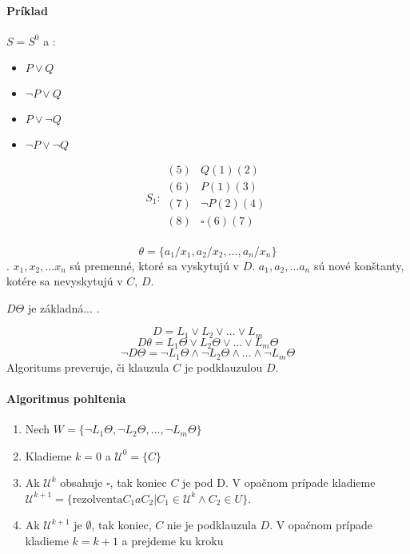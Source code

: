 \paragraph{Príklad} $S=S^0$ a :
\begin{itemize}
	\item $P\lor Q$
	\item $\neg P \lor Q$
	\item $P\lor \neg Q$
	\item $\neg P \lor \neg Q$
\end{itemize}
$$
S_1:
\begin{array}{ll}
(5)& Q (1) (2)\\
(6)& P (1) (3)\\
(7)& \neg P (2) (4)\\
(8)& \square (6) (7)\\
\end{array}
$$

$$\theta = \{ a_1 / x_1, a_2 / x_2, \ldots, a_n / x_n \}$$. $x_1, x_2, \ldots
x_n$ sú premenné, ktoré sa vyskytujú v $D$. $a_1, a_2, \ldots a_n$ sú nové
konštanty, kotére sa nevyskytujú v $C$, $D$.

$D\Theta$ je základná... .

$$D = L_1 \lor L_2 \lor \ldots \lor L_m$$
$$D \theta = L_1\Theta \lor L_2 \Theta \lor \ldots \lor L_m \Theta$$
$$\neg D\Theta = \neg L_1 \Theta \land \neg L_2 \Theta \land \ldots \land \neg
L_m \Theta$$
Algoritums preveruje, či klauzula $C$ je podklauzulou $D$.

\paragraph{Algoritmus  pohltenia}
\begin{enumerate}
	\item Nech $W = \{ \neg L_1 \Theta, \neg L_2 \Theta, \ldots, \neg L_m
	\Theta \}$

	\item Kladieme $k=0$ a $\mathcal{U}^0 = \{ C \}$
	\item Ak $\mathcal{U}^k$ obsahuje $\square$, tak koniec $C$ je pod D. V
	opačnom prípade kladieme $\mathcal{U}^{k+1} = \{ \mbox{rezolventa} C_1 a
	C_2 | C_1 \in \mathcal{U}^{k} \land C_2 \in U\}$. 
	\item Ak $\mathcal{U}^{k+1}$ je $\emptyset$, tak koniec, $C$ nie je
	podklauzula $D$. V opačnom prípade kladieme $k=k+1$ a prejdeme ku kroku

\end{enumerate}

